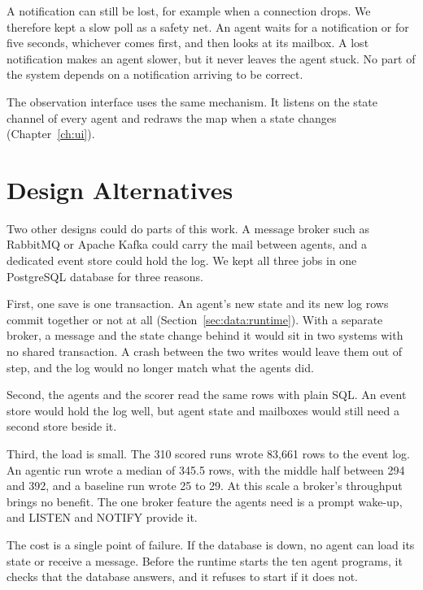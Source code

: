 A notification can still be lost, for example when a connection drops. We
therefore kept a slow poll as a safety net. An agent waits for a notification
or for five seconds, whichever comes first, and then looks at its mailbox.
A lost notification makes an agent slower, but it never leaves the agent
stuck. No part of the system depends on a notification arriving to be correct.

The observation interface uses the same mechanism. It listens on the state
channel of every agent and redraws the map when a state changes
(Chapter~\ref{ch:ui}).

\section{Design Alternatives}
\label{sec:data:alternatives}

Two other designs could do parts of this work. A message broker such as
RabbitMQ or Apache Kafka could carry the mail between agents, and a dedicated
event store could hold the log. We kept all three jobs in one PostgreSQL
database for three reasons.

First, one save is one transaction. An agent's new state and its new log rows
commit together or not at all (Section~\ref{sec:data:runtime}). With a separate
broker, a message and the state change behind it would sit in two systems with
no shared transaction. A crash between the two writes would leave them out of
step, and the log would no longer match what the agents did.

Second, the agents and the scorer read the same rows with plain SQL. An event
store would hold the log well, but agent state and mailboxes would still need a
second store beside it.

Third, the load is small. The 310 scored runs wrote 83,661 rows to the event
log. An agentic run wrote a median of 345.5 rows, with the middle half between
294 and 392, and a baseline run wrote 25 to 29. At this scale a broker's
throughput brings no benefit. The one broker feature the agents need is a prompt
wake-up, and LISTEN and NOTIFY provide it.

The cost is a single point of failure. If the database is down, no agent can
load its state or receive a message. Before the runtime starts the ten agent
programs, it checks that the database answers, and it refuses to start if it
does not.

